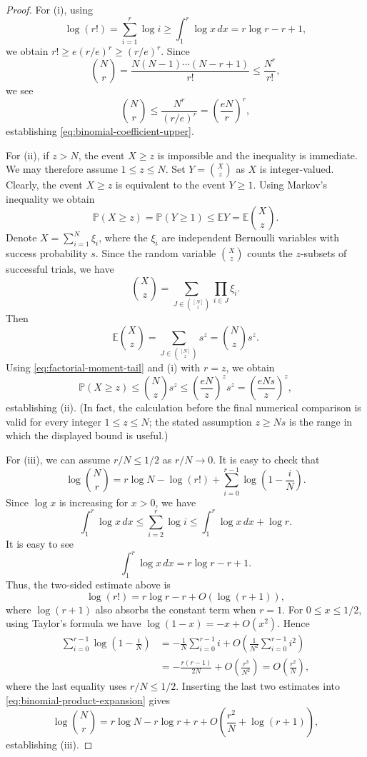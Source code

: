 \documentclass[10pt,a4paper]{amsart}
\newcommand{\EE}{\mathbb E}
\newcommand{\PP}{\mathbb P}
\begin{document}
\begin{proof}
For (i), using
\[
 \log(r!)=\sum_{i=1}^r\log i
 \ge\int_1^r\log x\,dx
 =r\log r-r+1,
\]
we obtain $r!\ge e(r/e)^r\ge(r/e)^r$.  Since
\[
 \binom Nr
 =\frac{N(N-1)\cdots(N-r+1)}{r!}
 \le\frac{N^r}{r!},
\]
we see
\[
 \binom Nr\le\frac{N^r}{(r/e)^r}
 =\left(\frac{eN}{r}\right)^r,
\]
establishing \eqref{eq:binomial-coefficient-upper}.

For (ii), if $z>N$, the event $X\ge z$ is impossible and the inequality
is immediate. We may therefore assume $1\le z\le N$.
Set $Y=\binom Xz$ as $X$ is integer-valued. Clearly, the event $X\ge z$ is equivalent to the event $Y\ge1$.  Using Markov's
inequality we obtain
\begin{equation}\label{eq:factorial-moment-tail}
 \PP(X\ge z)=\PP(Y\ge 1)\le\EE Y
 =\EE\binom Xz.
\end{equation}
Denote $X=\sum_{i=1}^N\xi_i$, where the $\xi_i$ are independent Bernoulli
variables with success probability $s$.  Since the random variable $\binom Xz$
counts the $z$-subsets of successful trials, we have
\[
 \binom Xz
 =\sum_{J\in\binom{[N]}z}\prod_{i\in J}\xi_i.
\]
Then
\[
 \EE\binom Xz
 =\sum_{J\in\binom{[N]}z}s^z
 =\binom Nzs^z.
\]
Using \eqref{eq:factorial-moment-tail} and (i) with $r=z$, we obtain 
\[
 \PP(X\ge z)
 \le\binom Nzs^z
 \le\left(\frac{eN}{z}\right)^zs^z
 =\left(\frac{eNs}{z}\right)^z,
\]
establishing (ii).  (In fact, the calculation before the final numerical
comparison is valid for every integer $1\le z\le N$; the stated assumption
$z\ge Ns$ is the range in which the displayed bound is useful.)

For (iii), we can assume $r/N\le1/2$ as $r/N\to0$.  It is easy to check that
\begin{equation}\label{eq:binomial-product-expansion}
 \log\binom Nr
 =r\log N-\log(r!)
  +\sum_{i=0}^{r-1}\log\left(1-\frac{i}{N}\right).
\end{equation}
Since $\log x$ is increasing for $x>0$, we have
\[
 \int_1^r\log x\,dx
 \le\sum_{i=2}^r\log i
 \le\int_1^r\log x\,dx+\log r.
\]
It is easy to see 
$$\int_1^r\log x\,dx=r\log r-r+1.$$
Thus, the two-sided estimate above is
\[
 \log(r!)=r\log r-r+O(\log(r+1)),
\]
where $\log(r+1)$ also absorbs the constant term when $r=1$.
For $0\le x\le1/2$, using Taylor's formula we have 
$\log(1-x)=-x+O(x^2)$.  
Hence
\begin{align*}
 \sum_{i=0}^{r-1}\log\left(1-\frac{i}{N}\right)
 &=-\frac1N\sum_{i=0}^{r-1}i
   +O\!\left(\frac1{N^2}\sum_{i=0}^{r-1}i^2\right)\\
 &=-\frac{r(r-1)}{2N}+O\!\left(\frac{r^3}{N^2}\right)
 =O\!\left(\frac{r^2}{N}\right),
\end{align*}
where the last equality uses $r/N\le1/2$.  Inserting the last two estimates
into \eqref{eq:binomial-product-expansion} gives
\[
 \log\binom Nr
 =r\log N-r\log r+r
  +O\!\left(\frac{r^2}{N}+\log(r+1)\right),
\]
establishing (iii).
\end{proof}
\end{document}
